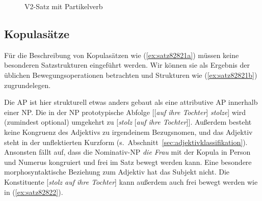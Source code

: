 \begin{figure}[!htbp]
  \centering
  \vspace{0.3cm}
  \caption{V2-Satz mit Partikelverb}
  \label{fig:v2mitpartikel}
\end{figure}

\subsection{Kopulasätze}

\label{sec:kopulakonstruktionen}


Für die Beschreibung von Kopulasätzen wie (\ref{ex:satz82821a}) müssen keine besonderen Satzstrukturen eingeführt werden.
Wir können sie als Ergebnis der üblichen Bewegungsoperationen betrachten und Strukturen wie (\ref{ex:satz82821b}) zugrundelegen.

\begin{exe}
  \ex\label{ex:satz82821} 
  \begin{xlist}
  \end{xlist}
\end{exe}

Die AP ist hier strukturell etwas anders gebaut als eine attributive AP innerhalb einer NP.
Die in der NP prototypische Abfolge [[\textit{auf ihre Tochter}] \textit{stolze}] wird (zumindest optional) umgekehrt zu [\textit{stolz} [\textit{auf ihre Tochter}]].
Außerdem besteht keine Kongruenz des Adjektivs zu irgendeinem Bezugsnomen, und das Adjektiv steht in der unflektierten Kurzform (s.\ Abschnitt~\ref{sec:adjektivklassifikation}).
Ansonsten fällt auf, dass die Nominativ-NP \textit{die Frau} mit der Kopula in Person und Numerus kongruiert und frei im Satz bewegt werden kann.
Eine besondere morphosyntaktische Beziehung zum Adjektiv hat das Subjekt nicht.
Die Konstituente [\textit{stolz auf ihre Tochter}] kann außerdem auch frei bewegt werden wie in (\ref{ex:satz82822}).

